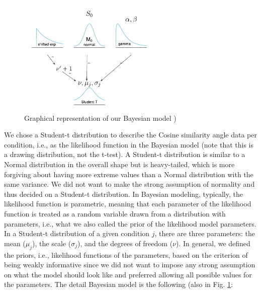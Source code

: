 \begin{figure}[htpb]
    \centering
    \includegraphics[width=0.6\textwidth, keepaspectratio=true]{content/image/model_1_diagram.pdf}
    \caption{
      Graphical representation of our Bayesian model )
    }
    \label{fig:bayesian_model_exp1}
\end{figure}

We chose a Student-t distribution 
to describe the Cosine similarity angle data per condition, 
i.e., as the likelihood function in the Bayesian model %
(note that this is a drawing distribution, not the t-test). 
A Student-t distribution is similar to a Normal distribution 
in the overall shape but is heavy-tailed, 
which is more forgiving about having more extreme values 
than a Normal distribution with the same variance. 
We did not want to make the strong assumption of normality 
and thus decided on a Student-t distribution. 
In Bayesian modeling, typically, the likelihood function is parametric, 
meaning that each parameter of the likelihood function is treated as a random variable 
drawn from a distribution with parameters, 
i.e., what we also called the prior of the likelihood model parameters. 
In a Student-t distribution of a given condition $j$, 
there are three parameters: 
the mean ($\mu_j$), the scale ($\sigma_j$), and the degrees of freedom ($\nu$). 
In general, we defined the priors, 
i.e., likelihood functions of the parameters, 
based on the criterion of being weakly informative 
since we did not want to impose any strong assumption on what the model should look like 
and preferred allowing all possible values for the parameters. 
The detail Bayesian model is the following (also in Fig. \ref{fig:bayesian_model_exp1}:

